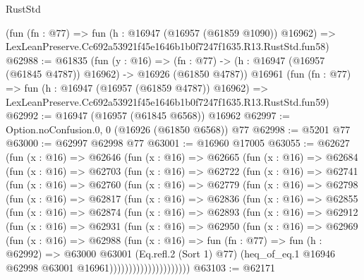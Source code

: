 \begin{lexlean}{RustStd}
\begin{coremodule}
    (fun (fn : @77) =>
    fun (h : @16947 (@16957 (@61859 @1090)) @16962) =>
    LexLeanPreserve.Cc692a53921f45e1646b1b0f7247f1635.R13.RustStd.fun58)
@62988 := @61835
    (fun (y : @16) =>
    (fn : @77) -> (h : @16947 (@16957 (@61845 @4787)) @16962) -> @16926 (@61850 @4787))
    @16961
    (fun (fn : @77) =>
    fun (h : @16947 (@16957 (@61859 @4787)) @16962) =>
    LexLeanPreserve.Cc692a53921f45e1646b1b0f7247f1635.R13.RustStd.fun59)
@62992 := @16947 (@16957 (@61845 @6568)) @16962
@62997 := Option.noConfusion.{0, 0} (@16926 (@61850 @6568)) @77
@62998 := @5201 @77
@63000 := @62997 @62998 @77
@63001 := @16960 @17005
@63055 := @62627
    (fun (x : @16) =>
    @62646
      (fun (x : @16) =>
      @62665
        (fun (x : @16) =>
        @62684
          (fun (x : @16) =>
          @62703
            (fun (x : @16) =>
            @62722
              (fun (x : @16) =>
              @62741
                (fun (x : @16) =>
                @62760
                  (fun (x : @16) =>
                  @62779
                    (fun (x : @16) =>
                    @62798
                      (fun (x : @16) =>
                      @62817
                        (fun (x : @16) =>
                        @62836
                          (fun (x : @16) =>
                          @62855
                            (fun (x : @16) =>
                            @62874
                              (fun (x : @16) =>
                              @62893
                                (fun (x : @16) =>
                                @62912
                                  (fun (x : @16) =>
                                  @62931
                                    (fun (x : @16) =>
                                    @62950
                                      (fun (x : @16) =>
                                      @62969
                                        (fun (x : @16) =>
                                        @62988
                                          (fun (x : @16) =>
                                          fun (fn : @77) =>
                                          fun (h : @62992) =>
                                          @63000
                                            @63001
                                            (Eq.refl.{2} (Sort 1) @77)
                                            (heq_of_eq.{1}
                                              @16946
                                              @62998
                                              @63001
                                              @16961)))))))))))))))))))))
@63103 := @62171

\end{coremodule}
\end{lexlean}
